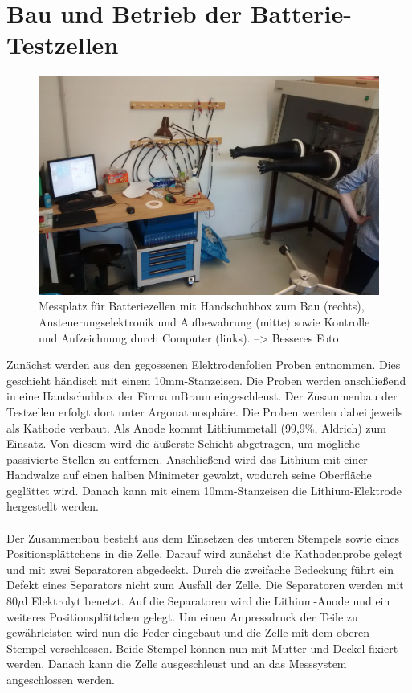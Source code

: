 \documentclass[a4paper, 11pt, headsepline,footsepline,twoside,abstract]{scrbook}
\begin{document}
\section{Bau und Betrieb der Batterie-Testzellen}
\begin{figure}
	\centering
	\includegraphics[width=0.95\columnwidth]{images/Messplatz.jpg}
	\caption{Messplatz für Batteriezellen mit Handschuhbox zum Bau (rechts), Ansteuerungselektronik und Aufbewahrung (mitte) sowie Kontrolle und Aufzeichnung durch Computer (links). --> Besseres Foto}
	\label{messaufbau}
\end{figure}
Zunächst werden aus den gegossenen Elektrodenfolien Proben entnommen. Dies geschieht händisch mit einem 10mm-Stanzeisen. Die Proben werden anschließend in eine Handschuhbox der Firma mBraun eingeschleust. Der Zusammenbau der Testzellen erfolgt dort unter Argonatmosphäre. Die Proben werden dabei jeweils als Kathode verbaut. Als Anode kommt Lithiummetall (99,9\%, Aldrich) zum Einsatz. Von diesem wird die äußerste Schicht abgetragen, um mögliche passivierte Stellen zu entfernen. Anschließend wird das Lithium mit einer Handwalze auf einen halben Minimeter gewalzt, wodurch seine Oberfläche geglättet wird. Danach kann mit einem 10mm-Stanzeisen die Lithium-Elektrode hergestellt werden.
\\\\
Der Zusammenbau besteht aus dem Einsetzen des unteren Stempels sowie eines Positionsplättchens in die Zelle. Darauf wird zunächst die Kathodenprobe gelegt und mit zwei Separatoren abgedeckt. Durch die zweifache Bedeckung führt ein Defekt eines Separators nicht zum Ausfall der Zelle. Die Separatoren werden mit 80$\mu$l Elektrolyt benetzt. Auf die Separatoren wird die Lithium-Anode und ein weiteres Positionsplättchen gelegt. Um einen Anpressdruck der Teile zu gewährleisten wird nun die Feder eingebaut und die Zelle mit dem oberen Stempel verschlossen. Beide Stempel können nun mit Mutter und Deckel fixiert werden. Danach kann die Zelle ausgeschleust und an das Messsystem angeschlossen werden.
\\\\
\end{document}

